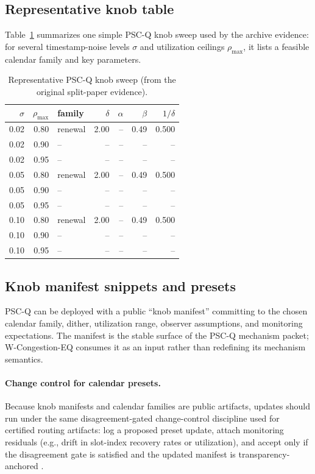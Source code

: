 \documentclass[11pt]{article}
\theoremstyle{definition}
\theoremstyle{remark}
\begin{document}
\subsection{Representative knob table}
Table~\ref{tab:pscq_knobs} summarizes one simple PSC-Q knob sweep used by the archive evidence: for several
timestamp-noise levels $\sigma$ and utilization ceilings $\rho_{\max}$, it lists a feasible calendar family and key parameters.
\begin{table}[h]
\centering
\begin{tabular}{r|r|l|r|r|r|r}
$\sigma$ & $\rho_{\max}$ & family & $\delta$ & $\alpha$ & $\beta$ & $1/\delta$ \\
\hline
0.02 & 0.80 & renewal & 2.00 & -- & 0.49 & 0.500\\
0.02 & 0.90 & -- & -- & -- & -- & --\\
0.02 & 0.95 & -- & -- & -- & -- & --\\
0.05 & 0.80 & renewal & 2.00 & -- & 0.49 & 0.500\\
0.05 & 0.90 & -- & -- & -- & -- & --\\
0.05 & 0.95 & -- & -- & -- & -- & --\\
0.10 & 0.80 & renewal & 2.00 & -- & 0.49 & 0.500\\
0.10 & 0.90 & -- & -- & -- & -- & --\\
0.10 & 0.95 & -- & -- & -- & -- & --\\
\end{tabular}
\caption{Representative PSC-Q knob sweep (from the original split-paper evidence).}\label{tab:pscq_knobs}
\end{table}

\subsection{Knob manifest snippets and presets}
PSC-Q can be deployed with a public ``knob manifest'' committing to the chosen calendar family, dither, utilization range, observer assumptions, and monitoring expectations.
The manifest is the stable surface of the PSC-Q mechanism packet; W-Congestion-EQ consumes it as an input rather than redefining its mechanism semantics.

\paragraph{Change control for calendar presets.}
Because knob manifests and calendar families are public artifacts, updates should run under the same disagreement-gated change-control discipline used for certified routing artifacts: log a proposed preset update, attach monitoring residuals (e.g., drift in slot-index recovery rates or utilization), and accept only if the disagreement gate is satisfied and the updated manifest is transparency-anchored \cite{series:recert,anondht_release_receipts}.
\end{document}
